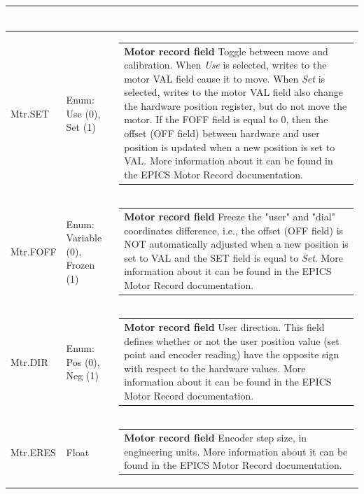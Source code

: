 \documentclass[openany]{article}
\begin{document}
\begin{longtable}{| m{4.5cm} m{2.5cm}  m{8.5cm} |}
\begin{tabular}{@{}m{6cm}@{}}
            \end{tabular} \hypertarget{pv:mtr-set}{}\\ \hline
        Mtr.SET & Enum: Use (0), Set (1) & \begin{tabular}{@{}m{6cm}@{}}
                \textbf{\color{ForestGreen} Motor record field} Toggle between move and calibration. When \emph{Use} is selected, writes to the motor VAL field cause it to move. When \emph{Set} is selected, writes to the motor VAL field also change the hardware position register, but do not move the motor. If the FOFF field is equal to 0, then the offset (OFF field) between hardware and user position is updated when a new position is set to VAL. More information about it can be found in the EPICS Motor Record documentation.
            \end{tabular} \hypertarget{pv:mtr-foff}{}\\ \hline
        Mtr.FOFF & Enum: Variable (0), Frozen (1) & \begin{tabular}{@{}m{6cm}@{}}
                \textbf{\color{ForestGreen} Motor record field} Freeze the "user" and "dial" coordinates difference, i.e., the offset (OFF field) is NOT automatically adjusted when a new position is set to VAL and the SET field is equal to \emph{Set}. More information about it can be found in the EPICS Motor Record documentation.
            \end{tabular} \hypertarget{pv:mtr-dir}{}\\ \hline
        Mtr.DIR & Enum: Pos (0), Neg (1) & \begin{tabular}{@{}m{6cm}@{}}
                \textbf{\color{ForestGreen} Motor record field} User direction. This field defines whether or not the user position value (set point and encoder reading) have the opposite sign with respect to the hardware values. More information about it can be found in the EPICS Motor Record documentation.
            \end{tabular} \hypertarget{pv:mtr-eres}{}\\ \hline
        Mtr.ERES & Float & \begin{tabular}{@{}m{6cm}@{}}
                \textbf{\color{ForestGreen} Motor record field} Encoder step size, in engineering units. More information about it can be found in the EPICS Motor Record documentation.
            \end{tabular} \hypertarget{pv:mtr-egu}{}\\ \hline

\end{longtable}
\end{document}
